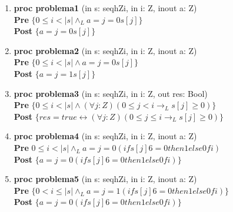 \documentclass{article}
\begin{document}
\begin{enumerate}[label=\alph*)]
\item \textbf{proc problema1 }(in s: seqhZi, in i: Z, inout a: Z) {\\
                                   
   \hspace*{6mm} \textbf{Pre }$\{0 \leq i < |s| \wedge_L a = j=0 s[j]\}$\\
                    
   \hspace*{6mm} \textbf{Post }$\{a = j=0 s[j]\}$\\
   }

\item \textbf{proc problema2 }(in s: seqhZi, in i: Z, inout a: Z) {\\
                                  
   \hspace*{6mm} \textbf{Pre }$\{0 \leq i < |s| \wedge a = j=0 s[j]\}$\\
                    
   \hspace*{6mm} \textbf{Post }$\{a = j=1 s[j]\}$\\
   }

\item \textbf{proc problema3 }(in s: seqhZi, in i: Z, out res: Bool) {\\
   \hspace*{6mm} \textbf{Pre }$\{0 \leq i < |s| \wedge 
   		(\forall j :Z)(0 \leq j < i \rightarrow_L s[j] \geq 0)\}$\\
   \hspace*{6mm} \textbf{Post }$\{res = true \leftrightarrow (\forall j :Z)
          (0 \leq j \leq i \rightarrow_L s[j] \geq 0)\}$\\
   }

\item \textbf{proc problema4 }(in s: seqhZi, in i: Z, inout a: Z) {\\
                                   
   \hspace*{6mm} \textbf{Pre }${0 \leq i < |s| \wedge_L a = j=0 (if s[j] 6= 0 
   		then 1 else 0 fi)}$\\
                   
   \hspace*{6mm} \textbf{Post }$\{a = j=0 (if s[j] 6= 0 then 1 else 0 fi)\}$\\
   }

\item \textbf{proc problema5 }(in s: seqhZi, in i: Z, inout a: Z) {\\
                                  
    \hspace*{6mm} \textbf{Pre }$\{0 < i \leq |s| \wedge_L a = j=1 (if s[j] 6= 0 
    then 1 else 0 fi)\}$\\
                    
   \hspace*{6mm} \textbf{Post }$\{a = j=0 (if s[j] 6= 0 then 1 else 0 fi)\}$\\
   }                     
\end{enumerate}
\end{document}
